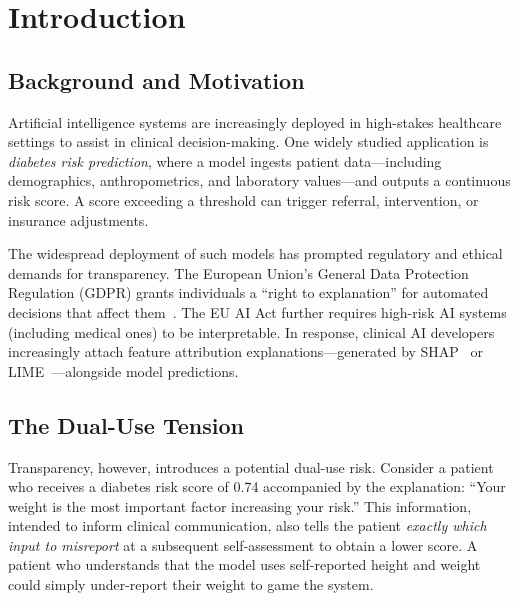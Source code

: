 \documentclass[12pt, a4paper, oneside]{report}
\theoremstyle{definition}
\begin{document}
\tableofcontents
\listoffigures
\listoftables

\chapter{Introduction}
\label{chap:intro}


\section{Background and Motivation}

Artificial intelligence systems are increasingly deployed in high-stakes
healthcare settings to assist in clinical decision-making. One widely
studied application is \textit{diabetes risk prediction}, where a model
ingests patient data---including demographics, anthropometrics, and
laboratory values---and outputs a continuous risk score. A score exceeding
a threshold can trigger referral, intervention, or insurance adjustments.

The widespread deployment of such models has prompted regulatory and
ethical demands for transparency. The European Union's General Data
Protection Regulation (GDPR) grants individuals a ``right to explanation''
for automated decisions that affect them~\citep{goodman2017european}.
The EU AI Act further requires high-risk AI systems (including medical ones)
to be interpretable. In response, clinical AI developers increasingly
attach feature attribution explanations---generated by SHAP~\citep{lundberg2017shap}
or LIME~\citep{ribeiro2016lime}---alongside model predictions.

\section{The Dual-Use Tension}

Transparency, however, introduces a potential dual-use risk. Consider a
patient who receives a diabetes risk score of 0.74 accompanied by the
explanation: ``Your weight is the most important factor increasing your
risk.'' This information, intended to inform clinical communication, also
tells the patient \textit{exactly which input to misreport} at a subsequent
self-assessment to obtain a lower score. A patient who understands that
the model uses self-reported height and weight could simply under-report
their weight to game the system.
\end{document}
